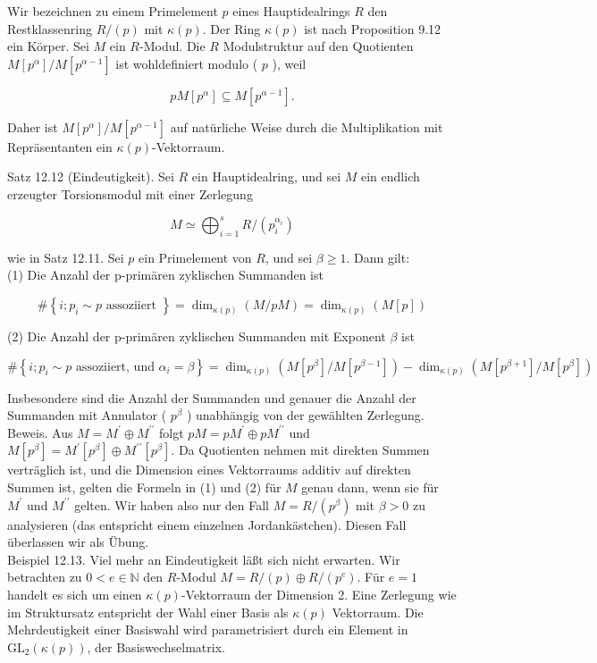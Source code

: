 \documentclass[10pt, letterpaper]{article}
\begin{document}
Wir bezeichnen zu einem Primelement $p$ eines Hauptidealrings $R$ den Restklassenring $R /(p)$ mit $\kappa(p)$. Der Ring $\kappa(p)$ ist nach Proposition 9.12 ein Körper. Sei $M$ ein $R$-Modul. Die $R$ Modulstruktur auf den Quotienten $M\left[p^{\alpha}\right] / M\left[p^{\alpha-1}\right]$ ist wohldefiniert modulo ( $p$ ), weil

$$
p M\left[p^{\alpha}\right] \subseteq M\left[p^{\alpha-1}\right] .
$$

Daher ist $M\left[p^{\alpha}\right] / M\left[p^{\alpha-1}\right]$ auf natürliche Weise durch die Multiplikation mit Repräsentanten ein $\kappa(p)$-Vektorraum.

Satz 12.12 (Eindeutigkeit). Sei $R$ ein Hauptidealring, und sei $M$ ein endlich erzeugter Torsionsmodul mit einer Zerlegung

$$
M \simeq \bigoplus_{i=1}^{s} R /\left(p_{i}^{\alpha_{i}}\right)
$$

wie in Satz 12.11. Sei $p$ ein Primelement von $R$, und sei $\beta \geq 1$. Dann gilt:\\
(1) Die Anzahl der p-primären zyklischen Summanden ist

$$
\#\left\{i ; p_{i} \sim p \text { assoziiert }\right\}=\operatorname{dim}_{\kappa(p)}(M / p M)=\operatorname{dim}_{\kappa(p)}(M[p])
$$

(2) Die Anzahl der p-primären zyklischen Summanden mit Exponent $\beta$ ist

$$
\#\left\{i ; p_{i} \sim p \text { assoziiert, und } \alpha_{i}=\beta\right\}=\operatorname{dim}_{\kappa(p)}\left(M\left[p^{\beta}\right] / M\left[p^{\beta-1}\right]\right)-\operatorname{dim}_{\kappa(p)}\left(M\left[p^{\beta+1}\right] / M\left[p^{\beta}\right]\right)
$$

Insbesondere sind die Anzahl der Summanden und genauer die Anzahl der Summanden mit Annulator ( $p^{\beta}$ ) unabhängig von der gewählten Zerlegung.\\
Beweis. Aus $M=M^{\prime} \oplus M^{\prime \prime}$ folgt $p M=p M^{\prime} \oplus p M^{\prime \prime}$ und $M\left[p^{\beta}\right]=M^{\prime}\left[p^{\beta}\right] \oplus M^{\prime \prime}\left[p^{\beta}\right]$. Da Quotienten nehmen mit direkten Summen verträglich ist, und die Dimension eines Vektorraums additiv auf direkten Summen ist, gelten die Formeln in (1) und (2) für $M$ genau dann, wenn sie für $M^{\prime}$ und $M^{\prime \prime}$ gelten. Wir haben also nur den Fall $M=R /\left(p^{\beta}\right)$ mit $\beta>0$ zu analysieren (das entspricht einem einzelnen Jordankästchen). Diesen Fall überlassen wir als Übung.\\
Beispiel 12.13. Viel mehr an Eindeutigkeit läßt sich nicht erwarten. Wir betrachten zu $0<e \in \mathbb{N}$ den $R$-Modul $M=R /(p) \oplus R /\left(p^{e}\right)$. Für $e=1$ handelt es sich um einen $\kappa(p)$-Vektorraum der Dimension 2. Eine Zerlegung wie im Struktursatz entspricht der Wahl einer Basis als $\kappa(p)$ Vektorraum. Die Mehrdeutigkeit einer Basiswahl wird parametrisiert durch ein Element in $\mathrm{GL}_{2}(\kappa(p))$, der Basiswechselmatrix.
\end{document}
